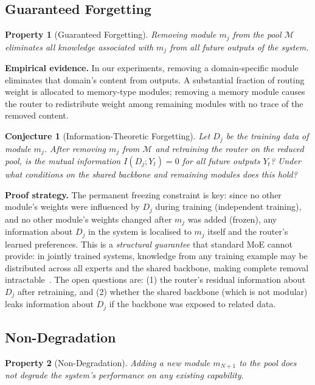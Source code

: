 \documentclass[11pt,a4paper]{article}
\newtheorem{property}{Property}
\newtheorem{conjecture}{Conjecture}
\begin{document}
\subsection{Guaranteed Forgetting}
\label{sec:forgetting}

\begin{property}[Guaranteed Forgetting]
Removing module $m_j$ from the pool $\mathcal{M}$ eliminates all knowledge associated with $m_j$ from all future outputs of the system.
\end{property}

\noindent\textbf{Empirical evidence.} In our experiments, removing a domain-specific module eliminates that domain's content from outputs. A substantial fraction of routing weight is allocated to memory-type modules; removing a memory module causes the router to redistribute weight among remaining modules with no trace of the removed content.

\begin{conjecture}[Information-Theoretic Forgetting]
Let $D_j$ be the training data of module $m_j$. After removing $m_j$ from $\mathcal{M}$ and retraining the router on the reduced pool, is the mutual information $I(D_j; Y_t) = 0$ for all future outputs $Y_t$? Under what conditions on the shared backbone and remaining modules does this hold?
\end{conjecture}

\noindent\textbf{Proof strategy.} The permanent freezing constraint is key: since no other module's weights were influenced by $D_j$ during training (independent training), and no other module's weights changed after $m_j$ was added (frozen), any information about $D_j$ in the system is localised to $m_j$ itself and the router's learned preferences. This is a \emph{structural guarantee} that standard MoE cannot provide: in jointly trained systems, knowledge from any training example may be distributed across all experts and the shared backbone, making complete removal intractable~\cite{bourtoule2021machine}. The open questions are: (1) the router's residual information about $D_j$ after retraining, and (2) whether the shared backbone (which is not modular) leaks information about $D_j$ if the backbone was exposed to related data.

\subsection{Non-Degradation}
\label{sec:nondeg}

\begin{property}[Non-Degradation]
Adding a new module $m_{N+1}$ to the pool does not degrade the system's performance on any existing capability.
\end{property}
\end{document}
